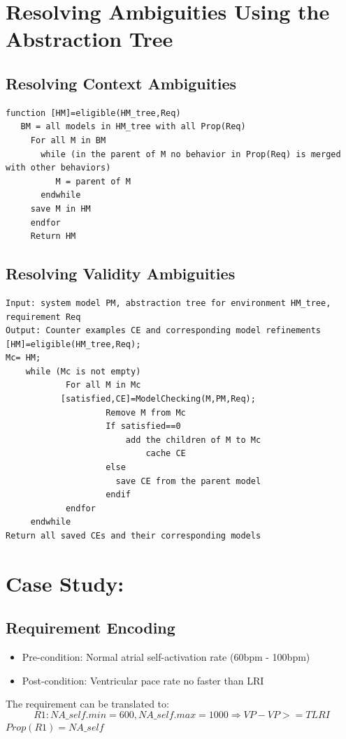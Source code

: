 \section{Resolving Ambiguities Using the Abstraction Tree}
\subsection{Resolving Context Ambiguities}
\begin{Verbatim}
function [HM]=eligible(HM_tree,Req)
   BM = all models in HM_tree with all Prop(Req)
	 For all M in BM
	   while (in the parent of M no behavior in Prop(Req) is merged with other behaviors)
	      M = parent of M
	   endwhile
	 save M in HM
	 endfor
	 Return HM
\end{Verbatim}

\subsection{Resolving Validity Ambiguities}

\begin{Verbatim}
Input: system model PM, abstraction tree for environment HM_tree, requirement Req
Output: Counter examples CE and corresponding model refinements
[HM]=eligible(HM_tree,Req);
Mc= HM;
    while (Mc is not empty)
		    For all M in Mc
           [satisfied,CE]=ModelChecking(M,PM,Req);
					Remove M from Mc
					If satisfied==0
					    add the children of M to Mc
							cache CE
					else
					  save CE from the parent model
					endif
			endfor
	 endwhile
Return all saved CEs and their corresponding models
\end{Verbatim}



\section{Case Study: }
\label{contextAmbiguities}
\subsection{Requirement Encoding}
\begin{itemize}
	\item Pre-condition: Normal atrial self-activation rate (60bpm - 100bpm)
    \item Post-condition: Ventricular pace rate no faster than LRI
\end{itemize}
The requirement can be translated to:
$$R1: NA\_self.min=600,NA\_self.max=1000\Rightarrow VP-VP>=TLRI$$
$Prop(R1)=NA\_self$

